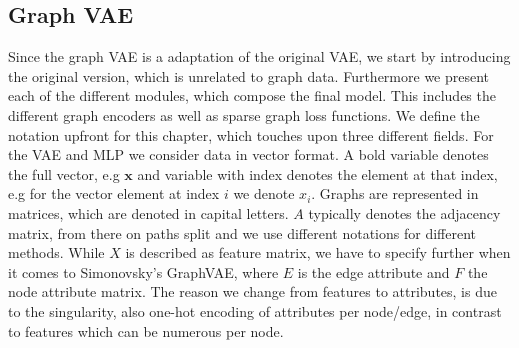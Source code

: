 



\subsection{Graph VAE}

Since the graph VAE is a adaptation of the original VAE, we start by introducing the original version, which is unrelated to graph data. Furthermore we present each of the different modules, which compose the final model. This includes the different graph encoders as well as sparse graph loss functions. We define the notation upfront for this chapter, which touches upon three different fields. For the VAE and MLP we consider data in vector format. A bold variable denotes the full vector, e.g $\mathbf{x}$ and variable with index denotes the element at that index, e.g for the vector element at index $i$ we denote $x_i$. Graphs are represented in matrices, which are denoted in capital letters. $A$ typically denotes the adjacency matrix, from there on paths split and we use different notations for different methods. While $X$ is described as feature matrix, we have to specify further when it comes to Simonovsky's GraphVAE, where $E$ is the edge attribute and $F$ the node attribute matrix. The reason we change from features to attributes, is due to the singularity, also one-hot encoding of attributes per node/edge, in contrast to features which can be numerous per node.


